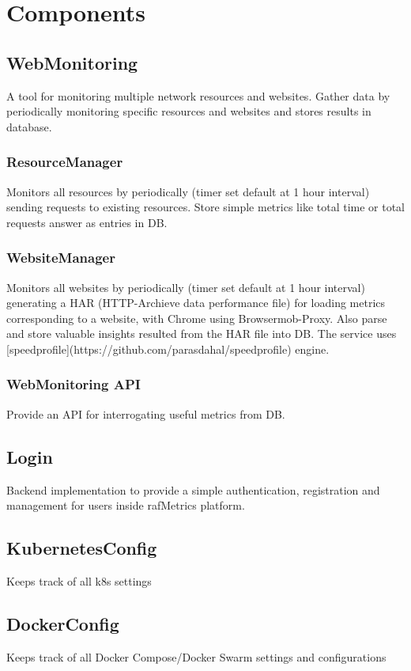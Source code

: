 \section{Components}

\subsection{WebMonitoring}
A tool for monitoring multiple network resources and websites. 
Gather data by periodically monitoring specific resources and websites and stores results in database.

\subsubsection{ResourceManager}
Monitors all resources by periodically (timer set default at 1 hour interval) sending requests to existing resources.
Store simple metrics like total time or total requests answer as entries in DB. 

\subsubsection{WebsiteManager}
Monitors all websites by periodically (timer set default at 1 hour interval) generating a HAR (HTTP-Archieve data performance file) for loading metrics corresponding to a website, with Chrome using Browsermob-Proxy.
Also parse and store valuable insights resulted from the HAR file into DB. 
The service uses [speedprofile](https://github.com/parasdahal/speedprofile) engine.

\subsubsection{WebMonitoring API}
Provide an API for interrogating useful metrics from DB.

\subsection{Login}
Backend implementation to provide a simple authentication, registration and management for users inside rafMetrics platform.

\subsection{KubernetesConfig}
Keeps track of all k8s settings

\subsection{DockerConfig}
Keeps track of all Docker Compose/Docker Swarm settings and configurations


